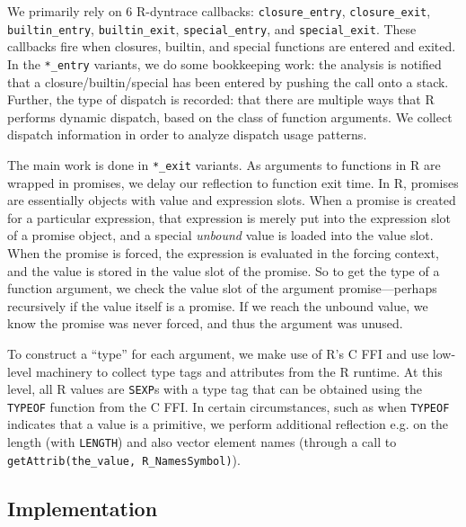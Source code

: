 \documentclass[acmsmall,review,anonymous]{acmart}\settopmatter{printfolios=true,printccs=false,printacmref=false}
\begin{document}
We primarily rely on 6 R-dyntrace callbacks: \texttt{closure\_entry}, \texttt{closure\_exit}, \texttt{builtin\_entry}, \texttt{builtin\_exit}, \texttt{special\_entry}, and \texttt{special\_exit}.
These callbacks fire when closures, builtin, and special functions are entered and exited.
In the \texttt{*\_entry} variants, we do some bookkeeping work: the analysis is notified that a closure/builtin/special has been entered by pushing the call onto a stack.
Further, the type of dispatch is recorded:  that there are multiple ways that R performs dynamic dispatch, based on the class of function arguments.
We collect dispatch information in order to analyze dispatch usage patterns.

The main work is done in \texttt{*\_exit} variants.
As arguments to functions in R are wrapped in promises, we delay our reflection to function exit time. 
In R, promises are essentially objects with value and expression slots.
When a promise is created for a particular expression, that expression is merely put into the expression slot of a promise object, and a special {\it unbound} value is loaded into the value slot.
When the promise is forced, the expression is evaluated in the forcing context, and the value is stored in the value slot of the promise.
So to get the type of a function argument, we check the value slot of the argument promise---perhaps recursively if the value itself is a promise.
If we reach the unbound value, we know the promise was never forced, and thus the argument was unused.

To construct a ``type'' for each argument, we make use of R's C FFI and use low-level machinery to collect type tags and attributes from the R runtime.
At this level, all R values are {\tt SEXP}s with a type tag that can be obtained using the {\tt TYPEOF} function from the C FFI.
In certain circumstances, such as when {\tt TYPEOF} indicates that a value is a primitive, we perform additional reflection e.g. on the length (with {\tt LENGTH}) and also vector element names (through a call to {\tt getAttrib(the\_value, R\_NamesSymbol)}).

\subsection{Implementation}

\end{document}
